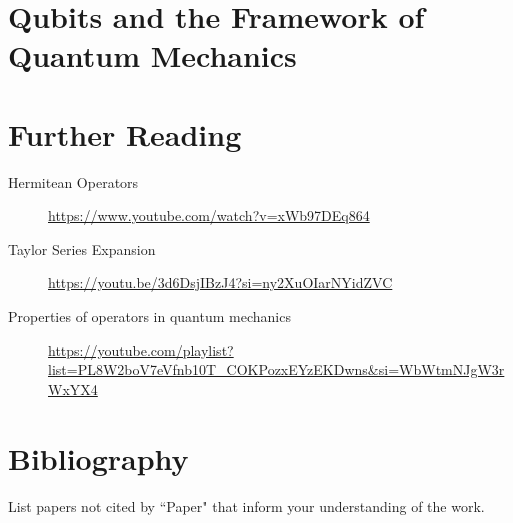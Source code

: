 \documentclass[12pt]{article}
\begin{document}
\clearpage

\section{Qubits and the Framework of Quantum Mechanics}

\clearpage

\section{Further Reading}

\begin{description}
    \item[Hermitean Operators] \url{https://www.youtube.com/watch?v=xWb97DEq864} 
    \item[Taylor Series Expansion] \url{https://youtu.be/3d6DsjIBzJ4?si=ny2XuOIarNYidZVC} 
    \item[Properties of operators in quantum mechanics]  \url{https://youtube.com/playlist?list=PL8W2boV7eVfnb10T_COKPozxEYzEKDwns&si=WbWtmNJgW3rWxYX4}
\end{description}

\section{Bibliography}
List papers not cited by ``Paper" that inform your understanding of the work.
\end{document}
